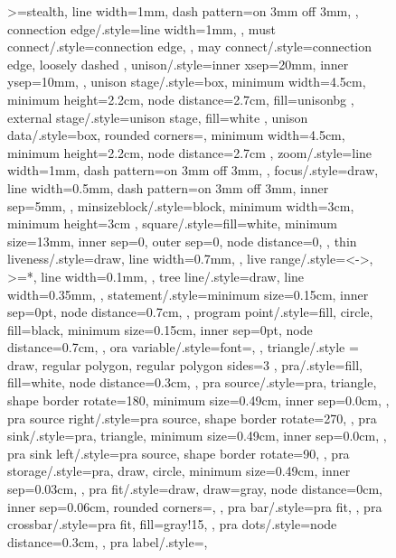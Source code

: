 \documentclass[acmsmall,authorversion,nonacm]{acmart}
\begin{document}
\begin{figure}
{{{{    >=stealth,
    line width=1mm,
    dash pattern=on 3mm off 3mm,
  },
  connection edge/.style={line width=1mm,
  },
  must connect/.style={connection edge,
  },
  may connect/.style={connection edge,
    loosely dashed
  },
  unison/.style={inner xsep=20mm,
    inner ysep=10mm,
  },
  unison stage/.style={box,
    minimum width=4.5cm,
    minimum height=2.2cm,
    node distance=2.7cm,
    fill=unisonbg
  },
  external stage/.style={unison stage,
    fill=white
  },
  unison data/.style={box,
    rounded corners=\cornerRadius,
    minimum width=4.5cm,
    minimum height=2.2cm,
    node distance=2.7cm
  },
  zoom/.style={line width=1mm,
    dash pattern=on 3mm off 3mm,
  },
  focus/.style={draw,
    line width=0.5mm,
    dash pattern=on 3mm off 3mm,
    inner sep=5mm,
  },
  minsizeblock/.style={block,
    minimum width=3cm,
    minimum height=3cm
  },
  square/.style={fill=white,
    minimum size=13mm,
    inner sep=0,
    outer sep=0,
    node distance=0,
  },
  thin liveness/.style={draw,
    line width=0.7mm,
  },
  live range/.style={<->,
      >=*,
      line width=0.1mm,
    },
  tree line/.style={draw,
    line width=0.35mm,
  },
  statement/.style={minimum size=0.15cm,
    inner sep=0pt,
    node distance=0.7cm,
  },
  program point/.style={fill,
    circle,
    fill=black,
    minimum size=0.15cm,
    inner sep=0pt,
    node distance=0.7cm,
  },
  ora variable/.style={font=\small,
  },
  triangle/.style = {draw, regular polygon, regular polygon sides=3 },
  pra/.style={fill,
    fill=white,
    node distance=0.3cm,
  },
  pra source/.style={pra,
    triangle,
    shape border rotate=180,
    minimum size=0.49cm,
    inner sep=0.0cm,
  },
  pra source right/.style={pra source,
    shape border rotate=270,
  },
  pra sink/.style={pra,
    triangle,
    minimum size=0.49cm,
    inner sep=0.0cm,
  },
  pra sink left/.style={pra source,
    shape border rotate=90,
  },
  pra storage/.style={pra,
    draw,
    circle,
    minimum size=0.49cm,
    inner sep=0.03cm,
  },
  pra fit/.style={draw,
    draw=gray,
    node distance=0cm,
    inner sep=0.06cm,
    rounded corners=\cornerRadius,
  },
  pra bar/.style={pra fit,
  },
  pra crossbar/.style={pra fit,
    fill=gray!15,
  },
  pra dots/.style={node distance=0.3cm,
  },
  pra label/.style={},
} 

}}
\end{figure}
\end{document}
